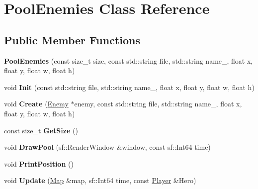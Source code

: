 \hypertarget{class_pool_enemies}{}\section{Pool\+Enemies Class Reference}
\label{class_pool_enemies}
\subsection*{Public Member Functions}
\begin{DoxyCompactItemize}
\item 
\mbox{\label{class_pool_enemies_a3dc2f638ddfe5961f9d19690ce8ffc42}} 
{\bfseries Pool\+Enemies} (const size\+\_\+t size, const std\+::string file, std\+::string name\+\_\+, float x, float y, float w, float h)
\item 
\mbox{\label{class_pool_enemies_a230f6d6152342974d814da58009826ea}} 
void {\bfseries Init} (const std\+::string file, std\+::string name\+\_\+, float x, float y, float w, float h)
\item 
\mbox{\label{class_pool_enemies_abd7f45866a211be06d9ff07f00a453d4}} 
void {\bfseries Create} (\hyperlink{class_enemy}{Enemy} $\ast$enemy, const std\+::string file, std\+::string name\+\_\+, float x, float y, float w, float h)
\item 
\mbox{\label{class_pool_enemies_aa4d6670db20d28b1425573a69dce6cd3}} 
const size\+\_\+t {\bfseries Get\+Size} ()
\item 
\mbox{\label{class_pool_enemies_ac00ab90555d06ab26e07f6679043b759}} 
void {\bfseries Draw\+Pool} (sf\+::\+Render\+Window \&window, const sf\+::\+Int64 time)
\item 
\mbox{\label{class_pool_enemies_a96a7fe66f07aed92fae70b53015f3a2f}} 
void {\bfseries Print\+Position} ()
\item 
\mbox{\label{class_pool_enemies_ac23a8dd2bc0dfa85317e44ec6a1680a9}} 
void {\bfseries Update} (\hyperlink{class_map}{Map} \&map, sf\+::\+Int64 time, const \hyperlink{class_player}{Player} \&Hero)
\item 
\mbox{\label{class_pool_enemies_a6c34f306bef5f07396d6b2a0afc33540}} 

\end{DoxyCompactItemize}
